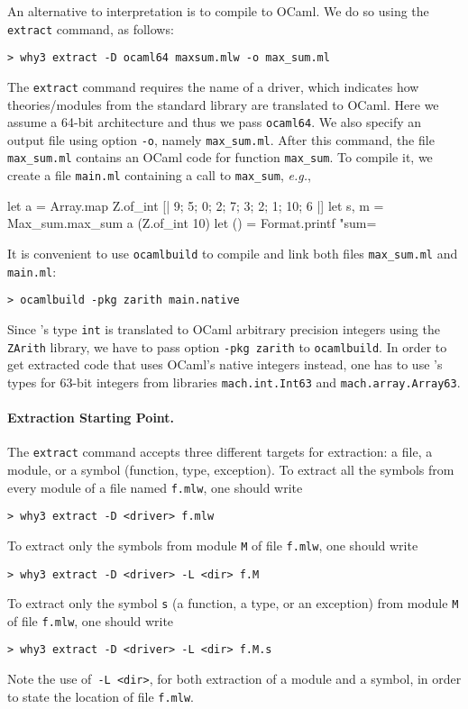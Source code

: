 An alternative to interpretation is to compile \whyml to OCaml.
We do so using the \texttt{extract} command, as follows:
\begin{verbatim}
> why3 extract -D ocaml64 maxsum.mlw -o max_sum.ml
\end{verbatim}
The \texttt{extract} command requires the name of a driver, which indicates
how theories/modules from the \why standard library are translated to
OCaml. Here we assume a 64-bit architecture and thus we pass
\texttt{ocaml64}. We also specify an output file using option
\verb+-o+, namely \texttt{max\_sum.ml}.
After this command, the file \texttt{max\_sum.ml} contains an OCaml
code for function \texttt{max\_sum}.
To compile it, we create a file \texttt{main.ml}
containing a call to \texttt{max\_sum}, \emph{e.g.},
\begin{whycode}
let a = Array.map Z.of_int [| 9; 5; 0; 2; 7; 3; 2; 1; 10; 6 |]
let s, m = Max_sum.max_sum a (Z.of_int 10)
let () = Format.printf "sum=%
\end{whycode}
It is convenient to use \texttt{ocamlbuild} to compile and link both
files \texttt{max\_sum.ml} and \texttt{main.ml}:
\begin{verbatim}
> ocamlbuild -pkg zarith main.native
\end{verbatim}
Since \why's type
\texttt{int} is translated to OCaml arbitrary precision integers using
the \texttt{ZArith} library, we have to pass option \texttt{-pkg
  zarith} to \texttt{ocamlbuild}. In order to get extracted code that
uses OCaml's native integers instead, one has to use \why's types for
63-bit integers from libraries \texttt{mach.int.Int63} and
\texttt{mach.array.Array63}.

\paragraph{Extraction Starting Point.} The \texttt{extract} command accepts three
different targets for extraction: a \whyml file, a module, or a symbol
(function, type, exception). To extract all the symbols from every module of a
file named \texttt{f.mlw}, one should write
\begin{verbatim}
> why3 extract -D <driver> f.mlw
\end{verbatim}
To extract only the symbols from module \texttt{M} of file \texttt{f.mlw}, one
should write
\begin{verbatim}
> why3 extract -D <driver> -L <dir> f.M
\end{verbatim}
To extract only the symbol \texttt{s} (a function, a type, or an exception) from
module \texttt{M} of file \texttt{f.mlw}, one should write
\begin{verbatim}
> why3 extract -D <driver> -L <dir> f.M.s
\end{verbatim}
Note the use of~\texttt{-L <dir>}, for both extraction of a module and a symbol,
in order to state the location of file \texttt{f.mlw}.

